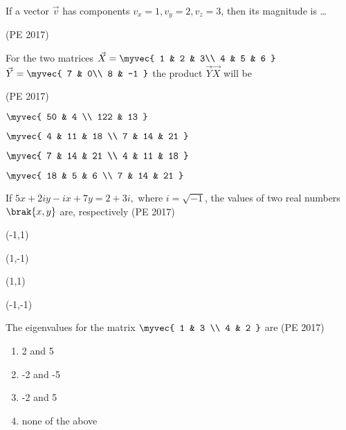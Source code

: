 \item If a vector $\vec{v}$ has components $v_x = 1, v_y = 2, v_z = 3$, then its magnitude is \dots

\hfill{(PE 2017)}

\item For the two matrices $\vec{X}=
\myvec{
1 & 2 & 3\\
4 & 5 & 6
}$ $\vec{Y}=
\myvec{
7 & 0\\
8 & -1
}$ the product $\vec{Y}\vec{X}$ will be

\hfill{(PE 2017)}
\begin{enumerate}
\begin{multicols}{4}
\item $  \myvec{ 
50 & 4 \\ 
122 & 13 
}$
\item $  \myvec{ 
4 & 11 & 18 \\ 
7 & 14 & 21 
}$
\item $  \myvec{ 
7 & 14 & 21 \\ 
4 & 11 & 18 
}$
\item $ \myvec{ 
18 & 5 & 6 \\ 
7 & 14 & 21 
}$
\end{multicols}
\end{enumerate}
\item If $ 5x + 2iy - ix + 7y = 2 + 3i,$ where $i = \sqrt{-1}$, the values of two real numbers $\brak{x, y}$ are, respectively
\hfill{(PE 2017)}
\begin{enumerate}
\begin{multicols}{4}
\item (-1,1)
\item (1,-1)
\item (1,1)
\item (-1,-1)
\end{multicols}
\end{enumerate}
\item The eigenvalues for the matrix $ \myvec{
1 & 3 \\
4 & 2 
}$ are
\hfill{(PE 2017)}
\begin{multicols}{2}
\begin{enumerate}
\item 2 and 5
\item -2 and -5
\item -2 and 5
\item none of the above
\end{enumerate}
\end{multicols}

